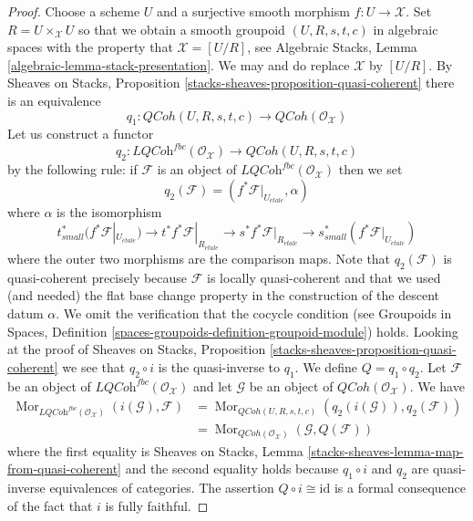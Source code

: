 \documentclass[10pt,a4paper]{amsart}
\theoremstyle{plain}
\theoremstyle{definition}
\theoremstyle{remark}
\numberwithin{equation}{subsection}
\def\Mor{\mathop{\mathrm{Mor}}\nolimits}
\def\etale{{\acute{e}tale}}
\def\QCoh{\mathit{QCoh}}
\begin{document}
\begin{proof}
Choose a scheme $U$ and a surjective smooth morphism $f : U \to \mathcal{X}$.
Set $R = U \times_\mathcal{X} U$ so that we obtain a smooth groupoid
$(U, R, s, t, c)$ in algebraic spaces with the property that
$\mathcal{X} = [U/R]$, see
Algebraic Stacks, Lemma \ref{algebraic-lemma-stack-presentation}.
We may and do replace $\mathcal{X}$ by $[U/R]$. By
Sheaves on Stacks, Proposition \ref{stacks-sheaves-proposition-quasi-coherent}
there is an equivalence
$$
q_1 :
\QCoh(U, R, s, t, c)
\longrightarrow
\QCoh(\mathcal{O}_\mathcal{X})
$$
Let us construct a functor
$$
q_2 :
\textit{LQCoh}^{fbc}(\mathcal{O}_\mathcal{X})
\longrightarrow
\QCoh(U, R, s, t, c)
$$
by the following rule: if $\mathcal{F}$ is an object of
$\textit{LQCoh}^{fbc}(\mathcal{O}_\mathcal{X})$ then we set
$$
q_2(\mathcal{F}) = (f^*\mathcal{F}|_{U_\etale}, \alpha)
$$
where $\alpha$ is the isomorphism
$$
t_{small}^*(f^*\mathcal{F}|_{U_\etale})
\to
t^*f^*\mathcal{F}|_{R_\etale} \to
s^*f^*\mathcal{F}|_{R_\etale} \to
s_{small}^*(f^*\mathcal{F}|_{U_\etale})
$$
where the outer two morphisms are the comparison maps. Note that
$q_2(\mathcal{F})$ is quasi-coherent precisely because $\mathcal{F}$ is
locally quasi-coherent and that we used (and needed)
the flat base change property in the construction of
the descent datum $\alpha$. We omit the
verification that the cocycle condition (see
Groupoids in Spaces, Definition
\ref{spaces-groupoids-definition-groupoid-module})
holds. Looking at the proof of
Sheaves on Stacks, Proposition \ref{stacks-sheaves-proposition-quasi-coherent}
we see that $q_2 \circ i$ is the quasi-inverse to $q_1$.
We define $Q = q_1 \circ q_2$.
Let $\mathcal{F}$ be an object of
$\textit{LQCoh}^{fbc}(\mathcal{O}_\mathcal{X})$ and
let $\mathcal{G}$ be an object of $\QCoh(\mathcal{O}_\mathcal{X})$.
We have
\begin{align*}
\Mor_{\textit{LQCoh}^{fbc}(\mathcal{O}_\mathcal{X})}
(i(\mathcal{G}), \mathcal{F})
& =
\Mor_{\QCoh(U, R, s, t, c)}(q_2(i(\mathcal{G})), q_2(\mathcal{F})) \\
& =
\Mor_{\QCoh(\mathcal{O}_\mathcal{X})}(\mathcal{G}, Q(\mathcal{F}))
\end{align*}
where the first equality is
Sheaves on Stacks, Lemma \ref{stacks-sheaves-lemma-map-from-quasi-coherent}
and the second equality holds because $q_1 \circ i$ and $q_2$ are quasi-inverse
equivalences of categories. The assertion $Q \circ i \cong \text{id}$
is a formal consequence of the fact that $i$ is fully faithful.
\end{proof}
\end{document}

